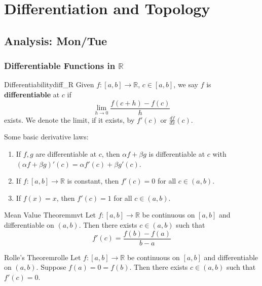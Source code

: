 \documentclass[11pt, letterpaper, openany]{book}
\begin{document}
\chapter{Differentiation and Topology}

\section{Analysis: Mon/Tue}

\subsection{Differentiable Functions in $\mathbb{R}$}

\begin{defn}{Differentiability}{diff_R}
Given $f:[a,b]\to\mathbb{R}$, $c\in[a,b]$, we say $f$ is \textbf{differentiable} at $c$ if 
\[\lim_{h\to0}\frac{f(c+h)-f(c)}{h}\]
exists. We denote the limit, if it exists, by $f'(c)$ or $\frac{df}{dx}(c)$.
\end{defn}

\begin{remark}
Some basic derivative laws:
\begin{enumerate}
    \item If $f,g$ are differentiable at $c$, then $\alpha f + \beta g$ is differentiable at $c$ with $(\alpha f + \beta g)'(c) = \alpha f'(c) + \beta g'(c)$.
    \item If $f:[a,b]\to\mathbb{R}$ is constant, then $f'(c) = 0$ for all $c \in (a,b)$.
    \item If $f(x) = x$, then $f'(c) = 1$ for all $c \in (a,b)$.
\end{enumerate}
\end{remark}

\begin{thm}{Mean Value Theorem}{mvt}
Let $f:[a,b]\to\mathbb{R}$ be continuous on $[a,b]$ and differentiable on $(a,b)$. Then there exists $c \in (a,b)$ such that
\[f'(c) = \frac{f(b) - f(a)}{b - a}\]
\end{thm}

\begin{thm}{Rolle's Theorem}{rolle}
Let $f:[a,b]\to\mathbb{R}$ be continuous on $[a,b]$ and differentiable on $(a,b)$. Suppose $f(a) = 0 = f(b)$. Then there exists $c \in (a,b)$ such that $f'(c) = 0$.
\end{thm}
\end{document}
